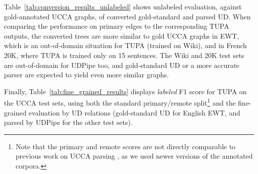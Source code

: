 \documentclass[11pt,a4paper]{article}
\begin{document}
Table~\ref{tab:conversion_results_unlabeled} shows unlabeled evaluation,
against gold-annotated UCCA graphs, of converted gold-standard and parsed UD.
When comparing the performance on primary edges to the corresponding TUPA outputs,
the converted trees are more similar to gold UCCA graphs
in EWT, which is an out-of-domain situation for TUPA (trained on Wiki),
and in French 20K, where TUPA is trained only on 15 sentences.
The Wiki and 20K test sets are out-of-domain for UDPipe too,
and gold-standard UD or a more accurate parser are expected to yield even more similar graphs.

Finally, Table~\ref{tab:fine_grained_results} displays \textit{labeled} F1 score for TUPA
on the UCCA test sets,
using both the standard primary/remote
split\footnote{Note that the primary and remote scores are not directly comparable to previous work
on UCCA parsing \cite{hershcovich2017a,hershcovich2018multitask},
as we used newer versions of the annotated corpora.}
and the fine-grained evaluation by UD relations
(gold-standard UD for English EWT, and parsed by UDPipe for the other test sets).
\end{document}
